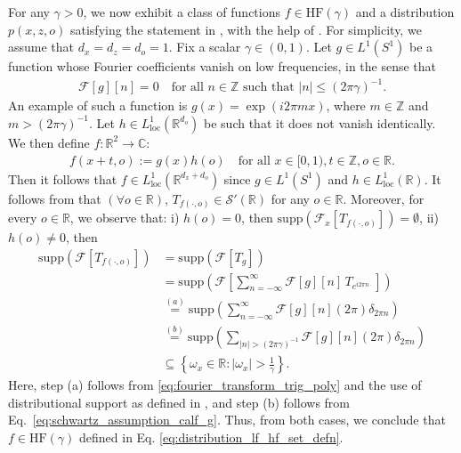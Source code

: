 \documentclass[11pt]{article}
\newcommand{\calF}{\mathcal{F}}
\newcommand{\R}{\mathbb{R}}
\newcommand{\0}{\mathbf{0}}
\begin{document}
\begin{appendix}
For any $\gamma>0$, we now exhibit a class of functions $f\in \mathrm{HF}(\gamma)$ and a distribution $p(x,z,o)$ satisfying the statement in , with the help of . For simplicity, we assume that $d_x = d_z = d_o = 1$.  Fix a scalar $\gamma \in(0,1)$. Let $g \in L^1\left(S^1\right)$ be a function whose Fourier coefficients vanish on low frequencies, in the sense that
\begin{align}
\label{eq:schwartz_assumption_calf_g}
    \mathcal{F}[g][n] = 0 \quad \text{for all } n \in \mathbb{Z} \text{ such that } |n| \leq (2\pi \gamma)^{-1}.
\end{align}
An example of such a function is $g(x) = \exp(i2\pi m x)$, where $m\in \mathbb{Z}$ and $m > (2\pi\gamma)^{-1}$. Let $h\in L^1_{\mathrm{loc}}(\mathbb{R}^{d_o})$ be such that it does not vanish identically. 
We then define $f:\mathbb{R}^{2} \to \mathbb{C}$:
\begin{align*}
f(x + t, o) := g(x)h(o) \quad \text{for all } x \in [0,1), t \in \mathbb{Z}, o \in \mathbb{R}.
\end{align*}
Then it follows that $f\in L^1_{\mathrm{loc}}(\mathbb{R}^{d_x+d_o})$ since $g\in L^1(S^{1})$ and $h\in L^1_{\mathrm{loc}}(\mathbb{R})$. It follows from  that $(\forall o\in \mathbb{R})$, $T_{f(\cdot, o)}\in \mathcal{S}'(\mathbb{R})$ for any $o\in\R$. Moreover, for every $o\in\R$, we observe that: i) $h(o) = 0$, then $\mathrm{supp}(\calF_x[T_{f(\cdot, o)}]) =  \emptyset$, ii) $h(o)\neq 0$, then
\begin{align*}
    \mathrm{supp}(\calF[T_{f(\cdot, o)}]) &= \mathrm{supp}(\calF[T_g])\\
    &= \mathrm{supp}\left(\calF\left[\sum_{n = -\infty}^{\infty}\calF[g][n]\,T_{e^{i2\pi n\cdot }}\right]\right)\\
    &\stackrel{(a)}{=} \mathrm{supp}\left(\sum_{n=-\infty}^{\infty}\calF[g][n](2\pi)\delta_{2\pi n}\right)\\
    &\stackrel{(b)}{=} \mathrm{supp}\left(\sum_{|n|> (2\pi\gamma)^{-1}}\calF[g][n](2\pi)\delta_{2\pi n}\right)\\
    &\subseteq \left\{\omega_x\in \mathbb{R} : |\omega_x| > \frac{1}{\gamma}\right\}.
\end{align*}
Here, step (a) follows from \eqref{eq:fourier_transform_trig_poly} and the use of distributional support as defined in , and step (b) follows from Eq.~\eqref{eq:schwartz_assumption_calf_g}. Thus, from both cases, we conclude that $f\in \mathrm{HF}(\gamma)$ defined in Eq. \eqref{eq:distribution_lf_hf_set_defn}. 


\end{appendix}
\end{document}
